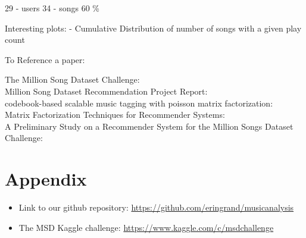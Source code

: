 \documentclass[12pt,preprint]{aastex}
\begin{document}
29 - users
34 - songs 
60 \%

Interesting plots:
- Cumulative Distribution of number of songs with a given play count

To Reference a paper: 

The Million Song Dataset Challenge: \citep{McFee:2012:MSD:2187980.2188222} \\
Million Song Dataset Recommendation Project Report: \citep{li2012million} \\
codebook-based scalable music tagging with poisson matrix factorization: \citep{liangcodebook} \\
Matrix Factorization Techniques for Recommender Systems: \citep{koren2009matrix} \\
A Preliminary Study on a Recommender System for the Million Songs Dataset Challenge: \citep{aiolli2013preliminary} \\





\small{
\section{Appendix}

\begin{itemize}

  \item Link to our github repository: \url{https://github.com/eringrand/musicanalysis}
  \item The MSD Kaggle challenge: \url{https://www.kaggle.com/c/msdchallenge}

\end{itemize}
}
\end{document}
